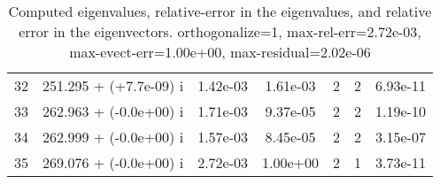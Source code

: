 \begin{table}[H]
\begin{center}
\begin{tabular}{|c|c|c|c|c|c|c|}
    32  &    251.295 + (+7.7e-09) i  &    1.42e-03      &   1.61e-03    &   2    &  2   &    6.93e-11 \\
    33  &    262.963 + (-0.0e+00) i  &    1.71e-03      &   9.37e-05    &   2    &  2   &    1.19e-10 \\
    34  &    262.999 + (-0.0e+00) i  &    1.57e-03      &   8.45e-05    &   2    &  2   &    3.15e-07 \\
    35  &    269.076 + (-0.0e+00) i  &    2.72e-03      &   1.00e+00    &   2    &  1   &    3.73e-11 \\
\hline
\end{tabular}
\caption{Computed eigenvalues, relative-error in the eigenvalues, and relative error in the eigenvectors. orthogonalize=1, max-rel-err=2.72e-03, max-evect-err=1.00e+00, max-residual=2.02e-06
}\label{table:genEigspipeze8.order2.hdf}
\end{center}
\end{table}
